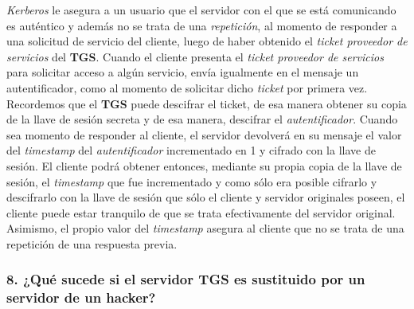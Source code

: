 \documentclass[12pt]{article}
\begin{document}
\textit{Kerberos} le asegura a un usuario que el servidor con el que se está comunicando es auténtico y además no se trata de una
\textit{repetición}, al momento de responder a una solicitud de servicio del cliente, luego de haber obtenido el \textit{ticket proveedor de servicios} del \textbf{TGS}.
Cuando el cliente presenta el \textit{ticket proveedor de servicios} para solicitar acceso a algún servicio, envía igualmente en el mensaje un autentificador, como al momento de solicitar dicho \textit{ticket} por primera vez. Recordemos que el \textbf{TGS} puede descifrar el ticket, de esa manera obtener su copia de la llave de sesión secreta y de esa manera, descifrar el \textit{autentificador}.
Cuando sea momento de responder al cliente, el servidor devolverá en su mensaje el valor del \textit{timestamp} del \textit{autentificador} incrementado en 1 y cifrado con
la llave de sesión. El cliente podrá obtener entonces, mediante su propia copia de la llave de sesión, el \textit{timestamp} que fue incrementado y como sólo era posible cifrarlo y descifrarlo con la llave de sesión que sólo el cliente y servidor originales poseen, el cliente puede estar tranquilo de que se trata efectivamente del servidor original. Asimismo, el propio valor del \textit{timestamp} asegura al cliente que no se trata de una
repetición de una respuesta previa. 


\subsubsection*{8. ¿Qué sucede si el servidor TGS es sustituido por un servidor de un hacker? }
\end{document}
